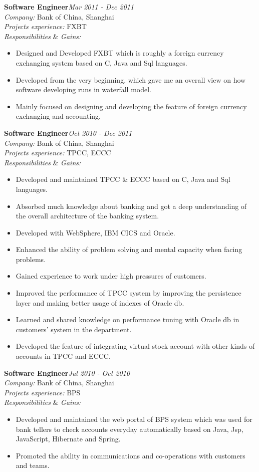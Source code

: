 \documentclass[line, margin, 11pt]{res}
\begin{document}
\begin{resume}
{\bf Software Engineer}\hfill {\it Mar 2011 - Dec 2011}\\
{\sl Company:} Bank of China, Shanghai\\
{\sl Projects experience:} FXBT\\
{\sl Responsibilities} \& {\sl Gains:}
\begin{itemize}
\item Designed and Developed FXBT which is roughly a foreign currency exchanging system based on C, Java and Sql languages.
\item Developed from the very beginning, which gave me an overall view on how software developing runs in waterfall model.
\item Mainly focused on designing and developing the feature of foreign currency exchanging and accounting.
\end{itemize}

{\bf Software Engineer}\hfill {\it Oct 2010 - Dec 2011}\\
{\sl Company:} Bank of China, Shanghai\\
{\sl Projects experience:} TPCC, ECCC\\
{\sl Responsibilities} \& {\sl Gains:}
\begin{itemize}
\item Developed and maintained TPCC \& ECCC based on C, Java and Sql languages.
\item Absorbed much knowledge about banking and got a deep understanding of the overall architecture of the banking system.
\item Developed with WebSphere, IBM CICS and Oracle.
\item Enhanced the ability of problem solving and mental capacity when facing problems.
\item Gained experience to work under high pressures of customers.
\item Improved the performance of TPCC system by improving the persistence layer and making better usage of indexes of Oracle db.
\item Learned and shared knowledge on performance tuning with Oracle db in customers' system in the department.
\item Developed the feature of integrating virtual stock account with other kinds of accounts in TPCC and ECCC.
\end{itemize}

{\bf Software Engineer}\hfill {\it Jul 2010 - Oct 2010}\\
{\sl Company:} Bank of China, Shanghai\\
{\sl Projects experience:} BPS\\
{\sl Responsibilities} \& {\sl Gains:}
\begin{itemize}
\item Developed and maintained the web portal of BPS system which was used for bank tellers to check accounts everyday automatically based on Java, Jsp, JavaScript, Hibernate and Spring.
\item Promoted the ability in communications and co-operations with customers and teams.
\end{itemize}


\end{resume}
\end{document}
